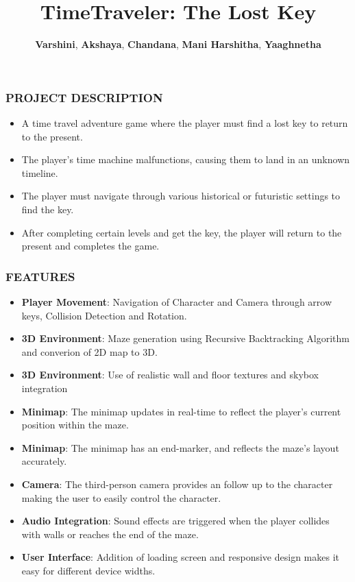 \documentclass[9pt]{beamer}
\title{\textbf{TimeTraveler: The Lost Key}}
\author{ \textbf{Varshini}, \textbf{Akshaya}, \textbf{Chandana}, \textbf{Mani Harshitha}, \textbf{Yaaghnetha}}
\begin{document}
\begin{frame}
\titlepage
\end{frame}

\begin{frame}
    \frametitle{PROJECT DESCRIPTION}
    \begin{itemize}
        \item A time travel adventure game where the player must find a lost key to return to the present.
        \item The player’s time machine malfunctions, causing them to land in an unknown timeline.
        \item The player must navigate through various historical or futuristic settings to find the key.
        \item After completing certain levels and get the key, the player will return to the present and completes the game.
    \end{itemize}
\end{frame}


\begin{frame}
    \frametitle{FEATURES}
    \begin{itemize}
        \item \textbf{Player Movement}: Navigation of Character and Camera through arrow keys, Collision Detection and Rotation.
        \item \textbf{3D Environment}: Maze generation using Recursive Backtracking Algorithm and converion of 2D map to 3D. 
        \item \textbf{3D Environment}: Use of realistic wall and floor textures and skybox integration
        \item \textbf{Minimap}: The minimap updates in real-time to reflect the player’s current position within the maze.
        \item \textbf{Minimap}: The minimap has an end-marker, and reflects the maze's layout accurately.
        \item \textbf{Camera}: The third-person camera provides an follow up to the character making the user to easily control the character.
        \item \textbf{Audio Integration}: Sound effects are triggered when the player collides with walls or reaches the end of the maze.
        \item \textbf{User Interface}: Addition of loading screen and responsive design makes it easy for different device widths.
    \end{itemize}
\end{frame}
\end{document}
